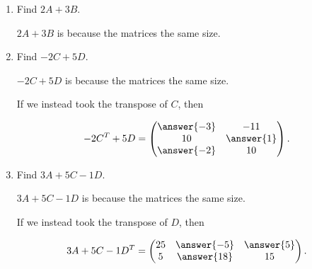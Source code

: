 \documentclass{ximera}
\begin{document}
\begin{enumerate}
\item Find $2A+3B$.
\begin{solution}

  $2A+3B$ is  because the matrices  the same size.

\end{solution}
\item Find $-2C+5D$.

\begin{solution}

  $-2C+5D$ is  because the matrices  the same size.

\begin{problem}

  If we instead took the transpose of $C$, then 
  
  $$-2C^T+5D=\begin{pmatrix} \answer{-3} & -11 \\ 10 & \answer{1} \\ \answer{-2} & 10 \end{pmatrix}.$$

\end{problem}

\end{solution}

\item Find $3A+5C-1D$.

\begin{solution}

  $3A+5C-1D$ is  because the matrices  the same size.

  \begin{problem}

    If we instead took the transpose of $D$, then 
    
    $$3A+5C-1D^T=\begin{pmatrix} 25 & \answer{-5} & \answer{5} \\ 5 & \answer{18} & 15 \end{pmatrix}.$$

  \end{problem}

\end{solution}

\end{enumerate}
\end{document}
